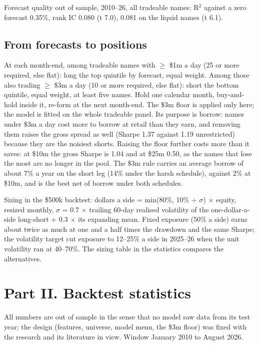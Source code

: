 \documentclass[
  10pt,
  a4paper,
]{article}
\begin{document}
Forecast quality out of sample, 2010--26, all tradeable
names: R\(^2\) against a zero forecast 0.35\%, rank IC 0.080
(t 7.0), 0.081 on the liquid names (t 6.1).

\subsection{From forecasts to
positions}\label{from-forecasts-to-positions}

At each month-end, among tradeable names with \(\geq\) \$1m
a day (25 or more required, else flat): long the top
quintile by forecast, equal weight. Among those also trading
\(\geq\) \$3m a day (10 or more required, else flat): short
the bottom quintile, equal weight, at least five names. Hold
one calendar month, buy-and-hold inside it, re-form at the
next month-end. The \$3m floor is applied only here; the
model is fitted on the whole tradeable panel. Its purpose is
borrow: names under \$3m a day cost more to borrow at retail
than they earn, and removing them raises the gross spread as
well (Sharpe 1.37 against 1.19 unrestricted) because they
are the noisiest shorts. Raising the floor further costs
more than it saves: at \$10m the gross Sharpe is 1.04 and at
\$25m 0.50, as the names that lose the most are no longer in
the pool. The \$3m rule carries an average borrow of about
7\% a year on the short leg (14\% under the harsh schedule),
against 2\% at \$10m, and is the best net of borrow under
both schedules.

Sizing in the \$500k backtest: dollars a side = min(80\%,
10\% \(\div\) \(\sigma\)) \(\times\) equity, resized
monthly, \(\sigma\) = 0.7 \(\times\) trailing 60-day
realised volatility of the one-dollar-a-side long-short +
0.3 \(\times\) its expanding mean. Fixed exposure (50\% a
side) earns about twice as much at one and a half times the
drawdown and the same Sharpe; the volatility target cut
exposure to 12--25\% a side in 2025--26 when the unit
volatility ran at 40--70\%. The sizing table in the
statistics compares the alternatives.

\section{Part II. Backtest
statistics}\label{part-ii.-backtest-statistics}

All numbers are out of sample in the sense that no model saw
data from its test year; the design (features, universe,
model menu, the \$3m floor) was fixed with the research and
its literature in view. Window January 2010 to August 2026.
\end{document}
